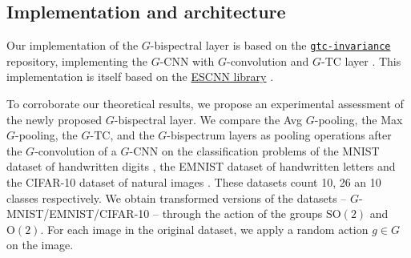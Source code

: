 \documentclass{article}
\theoremstyle{plain}
\theoremstyle{definition}
\theoremstyle{remark}
\begin{document}
\subsection{Implementation and architecture}
Our implementation of the $G$-bispectral layer is based on the \href{https://github.com/gtc-invariance/gtc-invariance}{\texttt{gtc-invariance}} repository, implementing the $G$-CNN with $G$-convolution and $G$-TC layer \cite{sanborn2023general}. This implementation is itself based on the \href{https://github.com/QUVA-Lab/escnn}{ESCNN library} \cite{cesa2022a, weiler2021general}.

To corroborate our theoretical results, we propose an experimental assessment of the newly proposed $G$-bispectral layer. We compare the Avg $G$-pooling, the Max $G$-pooling, the $G$-TC, and the $G$-bispectrum layers as pooling operations after the $G$-convolution of a $G$-CNN on the classification problems of the MNIST dataset of handwritten digits \cite{deng2012mnist}, the EMNIST dataset of handwritten letters \cite{cohen2017emnist} and the CIFAR-10 dataset of natural images \cite{CIFAR10}. These datasets count 10, 26 an 10 classes respectively. We obtain transformed versions of the datasets -- $G$-MNIST/EMNIST/CIFAR-10 -- through the action of the groups $\mathrm{SO}(2)$ and $\mathrm{O}(2)$. For each image in the original dataset, we apply a random action $g\in G$ on the image.
\end{document}
